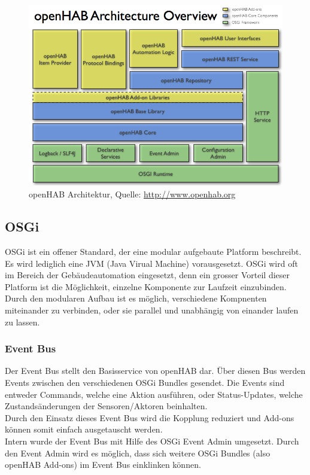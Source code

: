\begin{figure}[H]
	\centering
		\includegraphics[scale=0.45]{report/img/openHAB_architecture}
	\caption{openHAB Architektur, Quelle: \url{http://www.openhab.org}}
	\label{fig:ohArch}
\end{figure}

\subsection{OSGi}
OSGi ist ein offener Standard, der eine modular aufgebaute Platform beschreibt. Es wird lediglich eine JVM (Java Virual Machine) vorausgesetzt. OSGi wird oft im Bereich der Gebäudeautomation eingesetzt, denn ein grosser Vorteil dieser Platform ist die Möglichkeit, einzelne Komponente zur Laufzeit einzubinden. Durch den modularen Aufbau ist es möglich, verschiedene Kompnenten miteinander zu verbinden, oder sie parallel und unabhängig von einander laufen zu lassen.

\subsubsection{Event Bus}
Der Event Bus stellt den Basisservice von openHAB dar. Über diesen Bus werden Events zwischen den verschiedenen OSGi Bundles gesendet. Die Events sind entweder Commands, welche eine Aktion ausführen, oder Status-Updates, welche Zustandsänderungen der Sensoren/Aktoren beinhalten. \\
Durch den Einsatz dieses Event Bus wird die Kopplung reduziert und Add-ons können somit einfach ausgetauscht werden. \\
Intern wurde der Event Bus mit Hilfe des OSGi Event Admin umgesetzt. Durch den Event Admin wird es möglich, dass sich weitere OSGi Bundles (also openHAB Add-ons) im Event Bus einklinken können.

